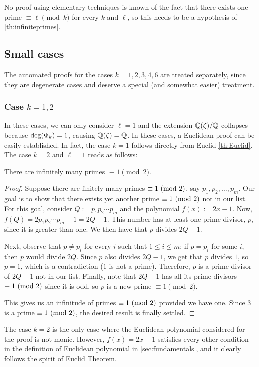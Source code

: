 \documentclass[../main.tex]{subfiles}
\begin{document}
No proof using elementary techniques is known of the fact that there exists one prime $\equiv\ell{\pmod{k}}$ for every $k$ and $\ell$, so this needs to be a hypothesis of \cref{th:infiniteprimes}.


\subsection{Small cases}\label{sec:smallcases}
The automated proofs for the cases $k=1,2,3,4,6$ are treated separately, since they are degenerate cases and deserve a special (and somewhat easier) treatment.

\subsubsection{Case \texorpdfstring{$k=1, 2$}{k=1,2}}
In these cases, we can only consider $\ell=1$ and the extension $\mathbb{Q}(\zeta)/ \mathbb{Q}$ collapses because $\operatorname{deg}(\Phi_k)=1$, causing $\mathbb{Q}(\zeta)=\mathbb{Q}$. In these cases, a Euclidean proof can be easily established. In fact, the case $k=1$ follows directly from Euclid \cref{th:Euclid}. The case $k=2$ and $\ell=1$ reads as follows:
\begin{lemma}
	There are infinitely many primes $\equiv 1\pmod{2}$.
\end{lemma}
\begin{proof}
Suppose there are finitely many primes $\equiv 1 \ (\mathrm{mod}\ 2)$, say $p_1, p_2,\dots,p_m$. Our goal is to show that there exists yet another prime $\equiv 1 \ (\mathrm{mod}\ 2)$ not in our list. For this goal, consider $Q:=p_1p_2\cdots p_m$ and the polynomial $f(x):=2x-1$. Now, $f(Q) = 2p_1p_2\cdots p_m-1=2Q-1$. This number has at least one prime divisor, $p$, since it is greater than one. We then have that $p$ divides $2Q-1$.

Next, observe that $p\neq p_i$ for every $i$ such that $1\leqslant i \leqslant m$: if $p=p_i$ for some $i$, then $p$ would divide $2Q$. Since $p$ also divides $2Q-1$, we get that $p$ divides $1$, so $p=1$, which is a contradiction ($1$ is not a prime). Therefore, $p$ is a prime divisor of $2Q-1$ not in our list. Finally, note that $2Q-1$ has all its prime divisors $\equiv 1 \ (\mathrm{mod}\ 2)$ since it is odd, so $p$ is a new prime $\equiv 1 \pmod{2}$.

This gives us an infinitude of primes $\equiv 1 \ (\mathrm{mod}\ 2)$ provided we have one. Since $3$ is a prime $\equiv 1 \ (\mathrm{mod}\ 2)$, the desired result is finally settled.
\end{proof}
The case $k=2$ is the only case where the Euclidean polynomial considered for the proof is not monic. However, $f(x)=2x-1$ satisfies every other condition in the definition of Euclidean polynomial in \cref{sec:fundamentals}, and it clearly follows the spirit of Euclid Theorem.
\end{document}
